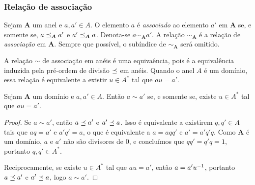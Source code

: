 
\subsubsection{Relação de associação}

\begin{definition}
Sejam $\bm A$ um anel e $a,a' \in A$. O elemento $a$ é \emph{associado} ao elemento $a'$ em $\bm A$ se, e somente se, $a \preceq_{\bm A} a'$ e $a' \preceq_{\bm A} a$. Denota-se $a \sim_{\bm A} a'$. A relação $\sim_{\bm A}$ é a relação de \emph{associação} em $\bm A$. Sempre que possível, o subíndice de $\sim_{\bm A}$ será omitido.
\end{definition}

A relação $\sim$ de associação em anéis é uma equivaência, pois é a equivalência induzida pela pré-ordem de divisão $\preceq$ em anéis. Quando o anel $A$ é um domínio, essa relação é equivalente a existir $u \in A^*$ tal que $au=a'$.

\begin{proposition}
Sejam $\bm A$ um domínio e $a,a' \in A$. Então $a \sim a'$ se, e somente se, existe $u \in A^*$ tal que $au=a'$.
\end{proposition}
\begin{proof}
Se $a \sim a'$, então $a \preceq a'$ e $a' \preceq a$. Isso é equivalente a existirem $q,q' \in A$ tais que $aq=a'$ e $a'q'=a$, o que é equivalente a $a=aqq'$ e $a'=a'q'q$.
Como $\bm A$ é um domínio, $a$ e $a'$ não são divisores de $0$, e concluímos que $qq'=q'q=1$, portanto $q,q' \in A^*$.

Reciprocamente, se existe $u \in A^*$ tal que $au=a'$, então $a=a'u^{-1}$, portanto $a \preceq a'$ e $a' \preceq a$, logo $a \sim a'$.
\end{proof}

